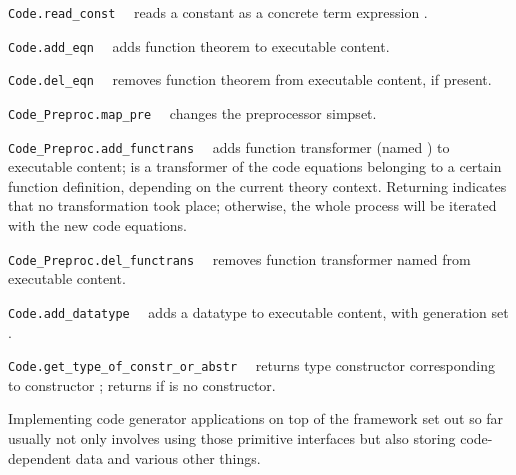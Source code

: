 \begin{isabellebody}
\begin{isamarkuptext}
  \begin{description}

  \item \verb|Code.read_const|~~
     reads a constant as a concrete term expression .

  \item \verb|Code.add_eqn|~~ adds function
     theorem  to executable content.

  \item \verb|Code.del_eqn|~~ removes function
     theorem  from executable content, if present.

  \item \verb|Code_Preproc.map_pre|~~ changes
     the preprocessor simpset.

  \item \verb|Code_Preproc.add_functrans|~~ adds
     function transformer  (named ) to executable content;
      is a transformer of the code equations belonging
     to a certain function definition, depending on the
     current theory context.  Returning  indicates that no
     transformation took place;  otherwise, the whole process will be iterated
     with the new code equations.

  \item \verb|Code_Preproc.del_functrans|~~ removes
     function transformer named  from executable content.

  \item \verb|Code.add_datatype|~~ adds
     a datatype to executable content, with generation
     set .

  \item \verb|Code.get_type_of_constr_or_abstr|~~
     returns type constructor corresponding to
     constructor ; returns 
     if  is no constructor.

  \end{description}%
\end{isamarkuptext}%
\isamarkuptrue%
%
\endisatagmlref
{\isafoldmlref}%
%
\isadelimmlref
%
\endisadelimmlref
%
\isamarkuptrue%
%
\begin{isamarkuptext}%
Implementing code generator applications on top of the framework set
  out so far usually not only involves using those primitive
  interfaces but also storing code-dependent data and various other
  things.


\end{isamarkuptext}
\end{isabellebody}

